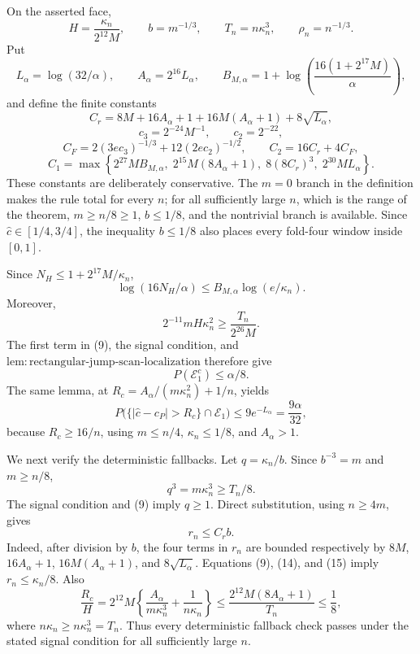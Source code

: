 On the asserted face,
\[
 H=\frac{\kappa_n}{2^{12}M},\qquad
 b=m^{-1/3},\qquad
 T_n=n\kappa_n^3,\qquad
 \rho_n=n^{-1/3}. \tag{8}
\]
Put
\[
 L_\alpha=\log(32/\alpha),\qquad A_\alpha=2^{16}L_\alpha,
 \qquad
 B_{M,\alpha}=1+\log\!\left(
   \frac{16(1+2^{17}M)}{\alpha}\right),
\]
and define the finite constants
\[
 C_r=8M+16A_\alpha+1+16M(A_\alpha+1)+8\sqrt{L_\alpha},
\]
\[
 c_3=2^{-24}M^{-1},\qquad c_2=2^{-22},
\]
\[
 C_F=2(3ec_3)^{-1/3}+12(2ec_2)^{-1/2},
 \qquad C_2=16C_r+4C_F,
\]
\[
 C_1=\max\left\{
 2^{27}MB_{M,\alpha},\;
 2^{15}M(8A_\alpha+1),\;
 8(8C_r)^3,\;
 2^{30}ML_\alpha
 \right\}. \tag{9}
\]
These constants are deliberately conservative.  The \(m=0\) branch
in the definition makes the rule total for every \(n\); for all
sufficiently large \(n\), which is the range of the theorem,
\(m\ge n/8\ge1\), \(b\le1/8\), and the nontrivial branch is available.
Since \(\widehat c\in[1/4,3/4]\), the inequality \(b\le1/8\) also
places every fold-four window inside \([0,1]\).

Since \(N_H\le1+2^{17}M/\kappa_n\),
\[
 \log(16N_H/\alpha)
 \le B_{M,\alpha}\log(e/\kappa_n). \tag{10}
\]
Moreover,
\[
 2^{-11}mH\kappa_n^2
 \ge\frac{T_n}{2^{26}M}. \tag{11}
\]
The first term in (9), the signal condition, and
\(\mathrm{lem:rectangular\mbox{-}jump\mbox{-}scan\mbox{-}localization}\)
therefore give
\[
 P(\mathcal E_1^c)\le\alpha/8. \tag{12}
\]
The same lemma, at
\(R_c=A_\alpha/(m\kappa_n^2)+1/n\), yields
\[
 P\bigl(\{|\widehat c-c_P|>R_c\}\cap\mathcal E_1\bigr)
 \le9e^{-L_\alpha}=\frac{9\alpha}{32}, \tag{13}
\]
because \(R_c\ge16/n\), using \(m\le n/4\),
\(\kappa_n\le1/8\), and \(A_\alpha>1\).

We next verify the deterministic fallbacks.  Let
\(q=\kappa_n/b\).  Since \(b^{-3}=m\) and \(m\ge n/8\),
\[
 q^3=m\kappa_n^3\ge T_n/8. \tag{14}
\]
The signal condition and (9) imply \(q\ge1\).  Direct substitution,
using \(n\ge4m\), gives
\[
 r_n\le C_rb. \tag{15}
\]
Indeed, after division by \(b\), the four terms in \(r_n\) are bounded
respectively by \(8M\), \(16A_\alpha+1\),
\(16M(A_\alpha+1)\), and \(8\sqrt{L_\alpha}\).  Equations (9),
(14), and (15) imply \(r_n\le\kappa_n/8\).  Also
\[
 \frac{R_c}{H}
 =2^{12}M\left\{
 \frac{A_\alpha}{m\kappa_n^3}+\frac1{n\kappa_n}
 \right\}
 \le\frac{2^{12}M(8A_\alpha+1)}{T_n}
 \le\frac18, \tag{16}
\]
where \(n\kappa_n\ge n\kappa_n^3=T_n\).  Thus every deterministic
fallback check passes under the stated signal condition for all
sufficiently large \(n\).

